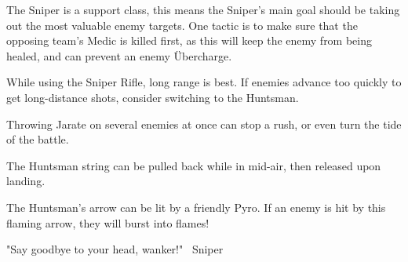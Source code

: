 The Sniper is a support class, this means the Sniper's main goal should be taking out the most valuable enemy targets. One tactic is to make sure that the opposing team's Medic is killed first, as this will keep the enemy from being healed, and can prevent an enemy Übercharge.

While using the Sniper Rifle, long range is best. If enemies advance too quickly to get long-distance shots, consider switching to the Huntsman.

Throwing Jarate on several enemies at once can stop a rush, or even turn the tide of the battle.

The Huntsman string can be pulled back while in mid-air, then released upon landing.

The Huntsman's arrow can be lit by a friendly Pyro. If an enemy is hit by this flaming arrow, they will burst into flames!

"Say goodbye to your head, wanker!" ~Sniper